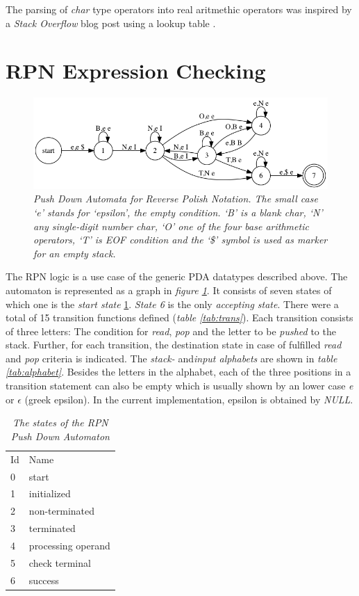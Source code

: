 \documentclass[a4paper,11pt,twoside]{article}
\begin{document}
The parsing of \textit{char} type operators into real aritmethic
operators was inspired by a \textit{Stack Overflow} blog post using a
lookup table \cite{lookup}.

\section{RPN Expression Checking}

\begin{figure}
 \centering
  \includegraphics[width=\textwidth]{pda}
  \caption{\textit{Push Down Automata for Reverse Polish Notation. The small
    case `e' stands for `epsilon', the empty condition. `B' is a blank
  char, `N' any single-digit number char, `O' one of the four base
  arithmetic operators, `T' is EOF condition and the `\$' symbol is
  used as marker for an empty stack.}}
  \label{fig:rpn}
\end{figure}

The RPN logic is a use case of the generic PDA datatypes described
above. The automaton is represented as a graph in \textit{figure
  \ref{fig:rpn}}. It consists of seven states of which one
is the \textit{start state} \ref{tab:states}. \textit{State 6} is the
only \textit{accepting state}. There were a total of 15 transition
functions defined (\textit{table \ref{tab:trans}}). Each transition
consists of three letters: The condition for \textit{read},
\textit{pop} and the letter to be \textit{pushed} to the
stack. Further, for each transition, the destination state in case of
fulfilled \textit{read} and \textit{pop} criteria is indicated. The
\textit{stack-} and\textit{input alphabets} are shown in \textit{table
  \ref{tab:alphabet}}. Besides the letters in the alphabet, each of
the three positions in a transition statement can also be empty which
is usually shown by an lower case \textit{e} or $\epsilon$ (greek
epsilon). In the current implementation, epsilon is obtained by
\textit{NULL}.

\begin{table}[]
\centering
\caption{\textit{The states of the RPN Push Down Automaton}}
\label{tab:states}
\begin{tabular}{ll}
Id & Name                   \\
0  & start                  \\
1  & initialized            \\
2  & non-terminated         \\
3  & terminated             \\
4  & processing operand     \\
5  & check terminal         \\
6  & success               
\end{tabular}
\end{table}
\end{document}
